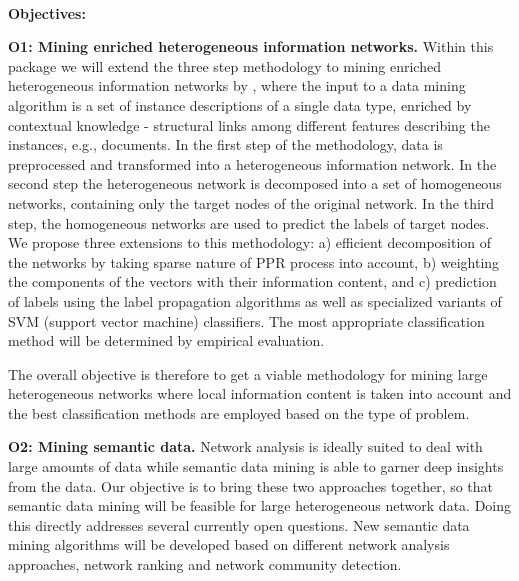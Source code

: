 \documentclass[a4paper,11pt]{article}
\begin{document}
%
%
\\[0,2cm]
\textbf{Objectives:}

\textbf{O1: Mining enriched heterogeneous information networks.} Within this package we will extend the three step methodology to mining enriched heterogeneous information networks by \citet{grcar2012}, where the input to a data mining algorithm is a set of instance descriptions of a single data type, enriched by contextual knowledge - structural links among different features describing the instances, e.g., documents.
In the first step of the methodology, data is preprocessed and transformed into a heterogeneous information network. In the second step the heterogeneous network is decomposed into a set of homogeneous networks, containing only the target nodes of the original network. In the third step, the homogeneous networks are used to predict the labels of target nodes. We propose three extensions to this methodology:
a) efficient decomposition of the networks by taking sparse nature of PPR process into account, b) weighting the components of the vectors with their information content, and
c) prediction of labels using the label propagation algorithms as well as specialized variants of SVM (support vector machine) classifiers. The most appropriate classification method will be determined by empirical evaluation.

The overall objective is therefore to get a viable methodology for mining large heterogeneous networks where local information content is taken into account and the best classification methods are employed based on the type of problem.

\textbf{O2: Mining semantic data.} Network analysis is ideally suited to deal with large amounts of data while semantic data mining is able to garner deep insights from the data. Our objective is to bring these two approaches together, so that semantic data mining will be feasible for large heterogeneous network data.
Doing this directly addresses several currently open questions. New semantic data mining algorithms will be developed based on different network analysis approaches, network ranking and network community detection. 
\end{document}
